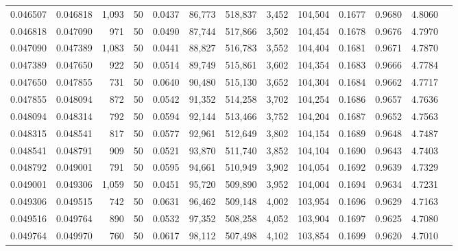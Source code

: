 \begin{tabular}{rrrrrrrrrrrrr}
0.046507 & 0.046818 & 1,093 &  50 &                                     0.0437 &  86,773 & 518,837 &   3,452 & 104,504 & 0.1677 & 0.9680 & 4.8060 \\
0.046818 & 0.047090 &   971 &  50 &                                     0.0490 &  87,744 & 517,866 &   3,502 & 104,454 & 0.1678 & 0.9676 & 4.7970 \\
0.047090 & 0.047389 & 1,083 &  50 &                                     0.0441 &  88,827 & 516,783 &   3,552 & 104,404 & 0.1681 & 0.9671 & 4.7870 \\
0.047389 & 0.047650 &   922 &  50 &                                     0.0514 &  89,749 & 515,861 &   3,602 & 104,354 & 0.1683 & 0.9666 & 4.7784 \\
0.047650 & 0.047855 &   731 &  50 &                                     0.0640 &  90,480 & 515,130 &   3,652 & 104,304 & 0.1684 & 0.9662 & 4.7717 \\
0.047855 & 0.048094 &   872 &  50 &                                     0.0542 &  91,352 & 514,258 &   3,702 & 104,254 & 0.1686 & 0.9657 & 4.7636 \\
0.048094 & 0.048314 &   792 &  50 &                                     0.0594 &  92,144 & 513,466 &   3,752 & 104,204 & 0.1687 & 0.9652 & 4.7563 \\
0.048315 & 0.048541 &   817 &  50 &                                     0.0577 &  92,961 & 512,649 &   3,802 & 104,154 & 0.1689 & 0.9648 & 4.7487 \\
0.048541 & 0.048791 &   909 &  50 &                                     0.0521 &  93,870 & 511,740 &   3,852 & 104,104 & 0.1690 & 0.9643 & 4.7403 \\
0.048792 & 0.049001 &   791 &  50 &                                     0.0595 &  94,661 & 510,949 &   3,902 & 104,054 & 0.1692 & 0.9639 & 4.7329 \\
0.049001 & 0.049306 & 1,059 &  50 &                                     0.0451 &  95,720 & 509,890 &   3,952 & 104,004 & 0.1694 & 0.9634 & 4.7231 \\
0.049306 & 0.049515 &   742 &  50 &                                     0.0631 &  96,462 & 509,148 &   4,002 & 103,954 & 0.1696 & 0.9629 & 4.7163 \\
0.049516 & 0.049764 &   890 &  50 &                                     0.0532 &  97,352 & 508,258 &   4,052 & 103,904 & 0.1697 & 0.9625 & 4.7080 \\
0.049764 & 0.049970 &   760 &  50 &                                     0.0617 &  98,112 & 507,498 &   4,102 & 103,854 & 0.1699 & 0.9620 & 4.7010 \\

\end{tabular}
